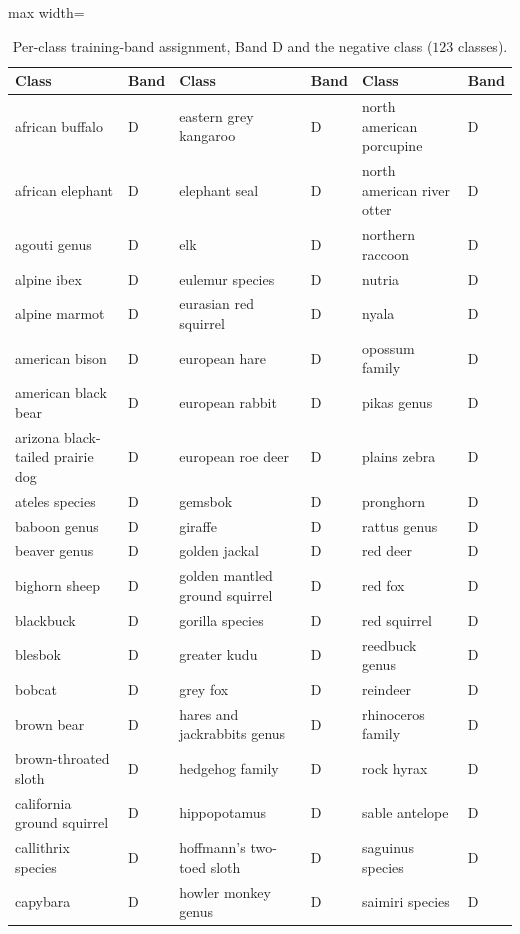 \begin{table}[p]
\centering
\footnotesize
{}
\caption{Per-class training-band assignment, Band D and the negative class ($123$ classes).}
\label{tab:appendix-class-band-assignment-d}
\begin{adjustbox}{max width=\textwidth}
\begin{tabular}{@{}llllll@{}}
    \toprule
    Class & Band & Class & Band & Class & Band \\
    \midrule
    african buffalo & D & eastern grey kangaroo & D & north american porcupine & D \\
    african elephant & D & elephant seal & D & north american river otter & D \\
    agouti genus & D & elk & D & northern raccoon & D \\
    alpine ibex & D & eulemur species & D & nutria & D \\
    alpine marmot & D & eurasian red squirrel & D & nyala & D \\
    american bison & D & european hare & D & opossum family & D \\
    american black bear & D & european rabbit & D & pikas genus & D \\
    arizona black-tailed prairie dog & D & european roe deer & D & plains zebra & D \\
    ateles species & D & gemsbok & D & pronghorn & D \\
    baboon genus & D & giraffe & D & rattus genus & D \\
    beaver genus & D & golden jackal & D & red deer & D \\
    bighorn sheep & D & golden mantled ground squirrel & D & red fox & D \\
    blackbuck & D & gorilla species & D & red squirrel & D \\
    blesbok & D & greater kudu & D & reedbuck genus & D \\
    bobcat & D & grey fox & D & reindeer & D \\
    brown bear & D & hares and jackrabbits genus & D & rhinoceros family & D \\
    brown-throated sloth & D & hedgehog family & D & rock hyrax & D \\
    california ground squirrel & D & hippopotamus & D & sable antelope & D \\
    callithrix species & D & hoffmann's two-toed sloth & D & saguinus species & D \\
    capybara & D & howler monkey genus & D & saimiri species & D \\

\end{tabular}
\end{adjustbox}
\end{table}
